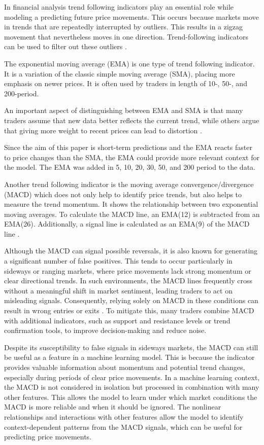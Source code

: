 In financial analysis trend following indicators play an essential role while modeling a predicting future price movements.
This occurs because markets move in trends that are repeatedly interrupted by outliers.
This results in a zigzag movement that nevertheless moves in one direction.
Trend-following indicators can be used to filter out these outliers \cite{investopia-trend-indicators}.

The exponential moving average (EMA) is one type of trend following indicator.
It is a variation of the classic simple moving average (SMA), placing more emphasis on newer prices.
It is often used by traders in length of 10-, 50-, and 200-period.

An important aspect of distinguishing between EMA and SMA is that many traders assume that new data better reflects the current trend, while others argue that giving more weight to recent prices can lead to distortion
\cite{investopia-ema}.


Since the aim of this paper is short-term predictions and the EMA reacts faster to price changes than the SMA, the EMA could provide more relevant context for the model.
The EMA was added in 5, 10, 20, 30, 50, and 200 period to the data.

Another trend following indicator is the moving average convergence/divergence (MACD) which does not only help to identify price trends, but also helps to measure the trend momentum.
It shows the relationship between two exponential moving averages.
To calculate the MACD line, an EMA(12) is subtracted from an EMA(26).
Additionally, a signal line is calculated as an EMA(9) of the MACD line \cite{investopia-macd}.


Although the MACD can signal possible reversals, it is also known for generating a significant number of false positives.
This tends to occur particularly in sideways or ranging markets, where price movements lack strong momentum or clear directional trends.
In such environments, the MACD lines frequently cross without a meaningful shift in market sentiment, leading traders to act on misleading signals.
Consequently, relying solely on MACD in these conditions can result in wrong entries or exits \cite{investopia-macd}.
To mitigate this, many traders combine MACD with additional indicators, such as support and resistance levels or trend confirmation tools, to improve decision-making and reduce noise.

Despite its susceptibility to false signals in sideways markets, the MACD can still be useful as a feature in a machine learning model.
This is because the indicator provides valuable information about momentum and potential trend changes, especially during periods of clear price movements.
In a machine learning context, the MACD is not considered in isolation but processed in combination with many other features.
This allows the model to learn under which market conditions the MACD is more reliable and when it should be ignored.
The nonlinear relationships and interactions with other features allow the model to identify context-dependent patterns from the MACD signals, which can be useful for predicting price movements.


